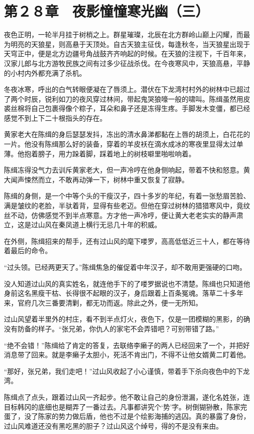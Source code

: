\section{第２８章　夜影憧憧寒光幽（三）}

夜色正明，一轮半月挂于树梢之上。群星璀璨，北辰在北方群岭山巅上闪耀，而最为明亮的天狼星，则高悬于天顶处。自古天狼主征伐，每逢秋冬，当天狼星出现于天穹正中，便是北方边疆号角战鼓齐齐响起的时候。在天狼的注视下，千百年来，汉家儿郎与北方游牧民族之间有过多少征战杀伐。在今夜寒风中，天狼高悬，平静的小村内外都充满了杀机。

冬夜冰寒，呼出的白气转眼便凝在了唇须上。潜伏在下龙湾村村外的树林中已超过了两个时辰，锐利如刀的夜风穿过林间，带起鬼哭狼嚎一般的啸叫。陈缉虽然用皮裘丝棉将自己包裹得像个粽子，耳朵和鼻子还是冻得生疼。手脚发木变僵，都已经感觉不到上下二十根指头的存在。

黄家老大在陈缉的身后瑟瑟发抖，冻出的清水鼻涕都黏在上唇的胡须上，白花花的一片。他没有陈缉那么好的装备，穿着的羊皮袄在滴水成冰的寒夜里显得太过单薄。他抱着膀子，用力跺着脚，踩着地上的树枝噼里啪啦响着。

陈缉冻得没气力去训斥黄家老大，但一声冷哼在他身侧响起，带着不快和怒意。黄大闻声悚然而立，不敢再动弹一下，树林中重又恢复了寂静。

陈缉的身侧，是一个中等个头的干瘦汉子，四十多岁的年纪，有着一张愁眉苦脸、满是皱纹的老脸，半驮着背，显得有些老迈。但他在穿过树林的猎猎寒风中，竟纹丝不动，仿佛感觉不到半点寒意。方才他一声冷哼，便让黄大老老实实的静声肃立，这是过山风在秦凤道上横行无忌几十年的积威。

在外侧，陈缉招来的帮手，还有过山风的麾下喽罗，高高低低近三十人，都在等待着最后的命令。

“过头领。已经两更天了。”陈缉焦急的催促着中年汉子，却不敢用更强硬的口吻。

没人知道过山风的真实姓名，就连他手下的了喽罗据说也不清楚。陈缉也只知道他身前这名黑瘦干枯、长得很不起眼的汉子，身后跟着上百条冤魂。落草二十多年来，官府几次三番要清剿，都无功而返。除此之外，便一无所知。

过山风望着半里外的村庄，看不到半点灯火，夜色下，仅是一团模糊的黑影，的确没有防备的样子。“张兄弟，你仇人的家宅不会弄错吧？可别带错了路。”

“绝不会错！”陈缉给了肯定的答复，去联络李癞子的两人已经回来了一个，并把好消息带了回来。就是李癞子太胆小，死活不肯出门，不得不让他女婿黄二盯着他。

“那好，张兄弟，我们走吧！”过山风收起了小心谨慎，带着手下杀向夜色中的下龙湾。

陈缉点了点头，跟着过山风一齐起步。他不敢让自己的身份泄漏，遂化名姓张，连目标韩冈的底细也是糊弄了一番过去。凡事都讲究个‘势’字。树倒猢狲散，陈家完蛋了，没了陈家的势力做后盾，他也不过是个绘影海捕的逃囚。真的暴露了身份，过山风难道还没有黑吃黑的胆子？过山风这个绰号，得的不是没有来由。

